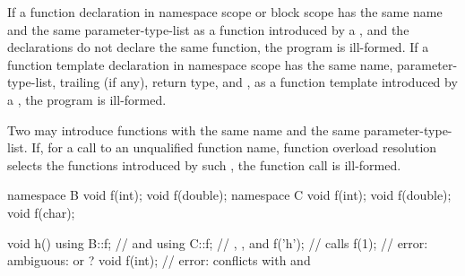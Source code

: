 \pnum
If a function declaration in namespace scope or block scope has the same
name and the same parameter-type-list as
a function introduced by a , and the
declarations do not declare the same function, the program is
ill-formed. If a function template declaration in namespace scope has
the same
name,
parameter-type-list,
trailing  (if any),
return type, and
,
as a function template introduced by a
, the program is ill-formed.
\begin{note}
Two  may introduce functions with the same
name and the same parameter-type-list. If, for a call to an unqualified
function name, function overload resolution selects the functions
introduced by such , the function call is
ill-formed.
\begin{example}
\begin{codeblock}
namespace B {
  void f(int);
  void f(double);
}
namespace C {
  void f(int);
  void f(double);
  void f(char);
}

void h() {
  using B::f;       //  and 
  using C::f;       // , , and 
  f('h');           // calls 
  f(1);             // error: ambiguous:  or ?
  void f(int);      // error:  conflicts with  and 
}
\end{codeblock}
\end{example}
\end{note}

